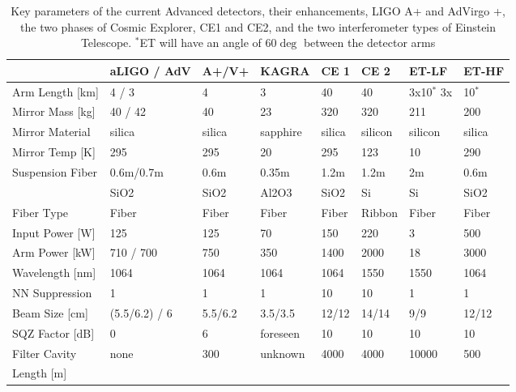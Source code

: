 \begin{table}[h]
\centering
\begin{tabular}{|l|l|l|p{1.6cm}|l|l|l|l|}
\hline
 &aLIGO / AdV &A+/V+ &KAGRA &CE 1 &CE 2 &ET-LF &ET-HF\\
\hline
Arm Length [km] & 4 / 3 &4& 3& 40& 40& 3x10$^*$ 3x&10$^*$\\
\hline
Mirror Mass [kg]& 40 / 42& 40& 23& 320& 320& 211& 200\\
\hline
Mirror Material& silica& silica& sapphire& silica& silicon& silicon& silica\\
\hline
Mirror Temp [K]& 295& 295& 20& 295& 123& 10& 290\\
\hline
Suspension Fiber& 0.6m/0.7m& 0.6m& 0.35m& 1.2m& 1.2m& 2m& 0.6m\\
& SiO2& SiO2&Al2O3&SiO2&Si&Si&SiO2\\
\hline
Fiber Type& Fiber& Fiber& Fiber& Fiber& Ribbon& Fiber& Fiber\\
\hline
Input Power [W]& 125& 125& 70& 150& 220& 3& 500\\
\hline
Arm Power [kW]& 710 / 700& 750& 350& 1400& 2000& 18& 3000\\
\hline
Wavelength [nm]& 1064& 1064& 1064& 1064& 1550& 1550& 1064\\
\hline
NN Suppression& 1& 1& 1& 10& 10& 1& 1\\
\hline
Beam Size [cm]& (5.5/6.2) / 6& 5.5/6.2& 3.5/3.5& 12/12& 14/14& 9/9& 12/12\\
\hline
SQZ Factor [dB]& 0& 6& foreseen& 10& 10& 10& 10\\
\hline
Filter Cavity & none& 300& unknown& 4000& 4000& 10000& 500\\
Length [m] &&&&&&&\\
\hline
\end{tabular}
\caption{Key parameters of the current Advanced detectors, their enhancements, LIGO A+ and AdVirgo +, the two phases of Cosmic Explorer, CE1 and CE2, and the two interferometer types of Einstein Telescope. $^*$ET will have an angle of 60$\deg$ between the detector arms}
\label{Tab:FutIfos}
\end{table}

